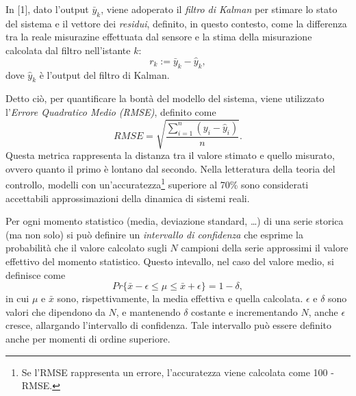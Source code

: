 \documentclass[Lau,binding=0.6cm]{sapthesis}
\begin{document}
In [1], dato l'output $\bar{y}_k$, viene adoperato il \textit{filtro di Kalman} per stimare lo stato del sistema e il vettore dei \textit{residui}, definito, in questo contesto, come la differenza tra la reale misurazine effettuata dal sensore
e la stima della misurazione calcolata dal filtro nell'istante $k$:
\begin{equation}
    r_k := \bar{y}_k - \hat{y}_k,
\end{equation}
dove $\hat{y}_k$ \`e l'output del filtro di Kalman.

Detto ci\`o, per quantificare la bont\`a del modello del sistema, viene utilizzato l'\textit{Errore Quadratico Medio (RMSE)}, definito come
\begin{equation}
    RMSE = \sqrt{\frac{\sum_{i=1}^n (y_i - \hat{y}_i)}{n}}\label{eq:5}.
\end{equation}
Questa metrica rappresenta la distanza tra il valore stimato e quello misurato, ovvero quanto il primo \`e lontano dal secondo.
Nella letteratura della teoria del controllo, modelli con un'accuratezza\footnote{Se l'RMSE rappresenta un errore, l'accuratezza viene calcolata come 100 - RMSE.} superiore al 70\% sono considerati accettabili approssimazioni della dinamica di sistemi reali.

Per ogni momento statistico (media, deviazione standard, \ldots) di una serie storica (ma non solo) si pu\`o definire un \textit{intervallo di confidenza} 
che esprime la probabilit\`a che il valore calcolato sugli $N$ campioni della serie approssimi il valore effettivo del momento statistico.
Questo intevallo, nel caso del valore medio, si definisce come 
\begin{equation}
    Pr\{\bar{x} - \epsilon \leq \mu \leq \bar{x} + \epsilon\} = 1 - \delta,
    \label{eq:2}
\end{equation}
in cui $\mu$ e $\bar{x}$ sono, rispettivamente, la media effettiva e quella calcolata. $\epsilon$ e $\delta$ sono valori che dipendono da $N$, e mantenendo $\delta$ costante
e incrementando $N$, anche $\epsilon$ cresce, allargando l'intervallo di confidenza.
Tale intervallo pu\`o essere definito anche per momenti di ordine superiore.
\end{document}
